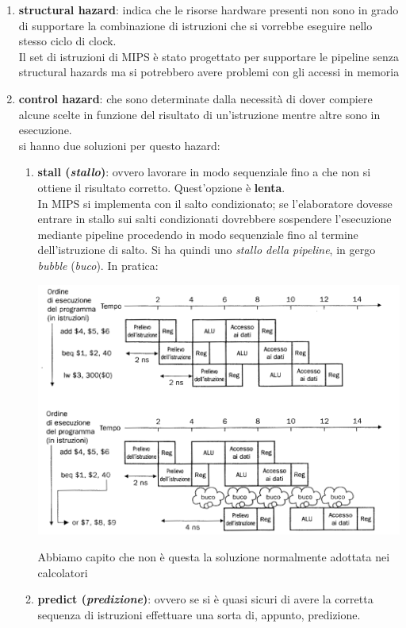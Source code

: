 \documentclass[a4paper,12pt, oneside]{book}
\begin{document}
\begin{enumerate}
  \item \textbf{structural hazard}: indica che le risorse hardware presenti non sono in grado di supportare la combinazione di istruzioni che si vorrebbe eseguire nello stesso ciclo di clock.\\
  Il set di istruzioni di MIPS è stato progettato per supportare le pipeline senza structural hazards ma si potrebbero avere problemi con gli accessi in memoria
  \item \textbf{control hazard}: che sono determinate dalla necessità di dover compiere alcune scelte in funzione del risultato di un'istruzione mentre altre sono in esecuzione.\\
  si hanno due soluzioni per questo hazard:
  \begin{enumerate}
    \item \textbf{stall (\textit{stallo})}: ovvero lavorare in modo sequenziale fino a che non si ottiene il risultato corretto. Quest'opzione è \textbf{lenta}.\\
    In MIPS si implementa con il salto condizionato; se l'elaboratore dovesse entrare in stallo sui salti condizionati
    dovrebbere sospendere l'esecuzione mediante pipeline procedendo in modo sequenziale fino al termine dell'istruzione di salto. Si ha quindi uno \textit{stallo della pipeline}, in gergo \textit{bubble} (\textit{buco}). In pratica:
    \begin{center}
      \includegraphics[scale = 0.7]{img/bubble.png}
    \end{center}
    Abbiamo capito che non è questa la soluzione normalmente adottata nei calcolatori
    \item \textbf{predict (\textit{predizione})}: ovvero se si è quasi sicuri di avere la corretta sequenza di istruzioni effettuare una sorta di, appunto, predizione. \\

\end{enumerate}
\end{enumerate}
\end{document}
